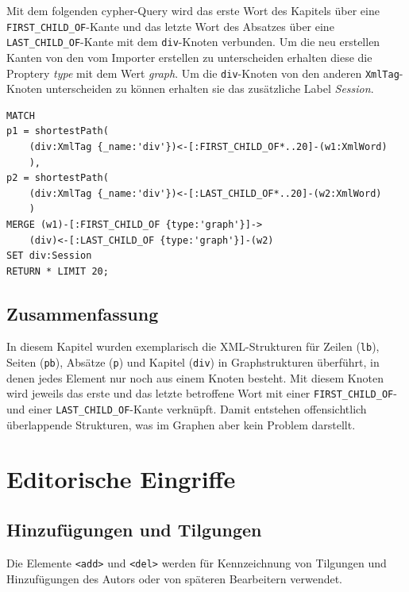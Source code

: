 \documentclass[ngerman,]{scrreprt}
\begin{document}
Mit dem folgenden cypher-Query wird das erste Wort des Kapitels über eine \texttt{FIRST\_CHILD\_OF}-Kante und das letzte Wort des Absatzes über eine \texttt{LAST\_CHILD\_OF}-Kante mit dem \texttt{div}-Knoten verbunden. Um die neu erstellen Kanten von den vom Importer erstellen zu unterscheiden erhalten diese die Proptery \emph{type} mit dem Wert \emph{graph}. Um die \texttt{div}-Knoten von den anderen \texttt{XmlTag}-Knoten unterscheiden zu können erhalten sie das zusätzliche Label \emph{Session}.

\begin{verbatim}
MATCH
p1 = shortestPath(
    (div:XmlTag {_name:'div'})<-[:FIRST_CHILD_OF*..20]-(w1:XmlWord)
    ),
p2 = shortestPath(
    (div:XmlTag {_name:'div'})<-[:LAST_CHILD_OF*..20]-(w2:XmlWord)
    )
MERGE (w1)-[:FIRST_CHILD_OF {type:'graph'}]->
    (div)<-[:LAST_CHILD_OF {type:'graph'}]-(w2)
SET div:Session
RETURN * LIMIT 20;
\end{verbatim}

\subsection{Zusammenfassung}\label{zusammenfassung-4}

In diesem Kapitel wurden exemplarisch die XML-Strukturen für Zeilen (\texttt{lb}), Seiten (\texttt{pb}), Absätze (\texttt{p}) und Kapitel (\texttt{div}) in Graphstrukturen überführt, in denen jedes Element nur noch aus einem Knoten besteht. Mit diesem Knoten wird jeweils das erste und das letzte betroffene Wort mit einer \texttt{FIRST\_CHILD\_OF}- und einer \texttt{LAST\_CHILD\_OF}-Kante verknüpft. Damit entstehen offensichtlich überlappende Strukturen, was im Graphen aber kein Problem darstellt.

\section{Editorische Eingriffe}\label{editorische-eingriffe}

\subsection{Hinzufügungen und Tilgungen}\label{hinzufuxfcgungen-und-tilgungen}

Die Elemente \texttt{\textless{}add\textgreater{}} und \texttt{\textless{}del\textgreater{}} werden für Kennzeichnung von Tilgungen und Hinzufügungen des Autors oder von späteren Bearbeitern verwendet.
\end{document}
